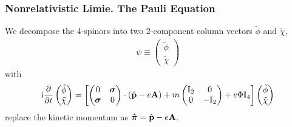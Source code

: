 \subsubsection{Nonrelativistic Limie. The Pauli Equation}
We decompose the 4-spinors into two 2-component column vectors $\tilde{\phi}$ and $\tilde{\chi}$, 
\begin{align*}
    \psi \equiv \begin{pmatrix}
        \tilde{\phi} \\
        \tilde{\chi}
    \end{pmatrix}
\end{align*}
with 
\begin{align}
    \mathrm{i} \frac{\partial }{\partial t} \begin{pmatrix}
        \tilde{\phi} \\
        \tilde{\chi}
    \end{pmatrix} = \left[ \begin{pmatrix}
        0 & \boldsymbol{\sigma} \\
        \boldsymbol{\sigma} & 0
    \end{pmatrix} \cdot \left(\hat{\mathbf{p}} - e \mathbf{A}\right) + m \begin{pmatrix}
        \mathbb{I}_2 & 0 \\
        0 & - \mathbb{I}_2
    \end{pmatrix} + e \Phi \mathbb{I}_4 \right] \begin{pmatrix}
        \tilde{\phi} \\
        \tilde{\chi}
    \end{pmatrix} \label{eq:Dirac_equation_2component}
\end{align}
replace the kinetic momentum as $\boldsymbol{\hat{\pi}} = \hat{\mathbf{p}} - e \mathbf{A}$. 

